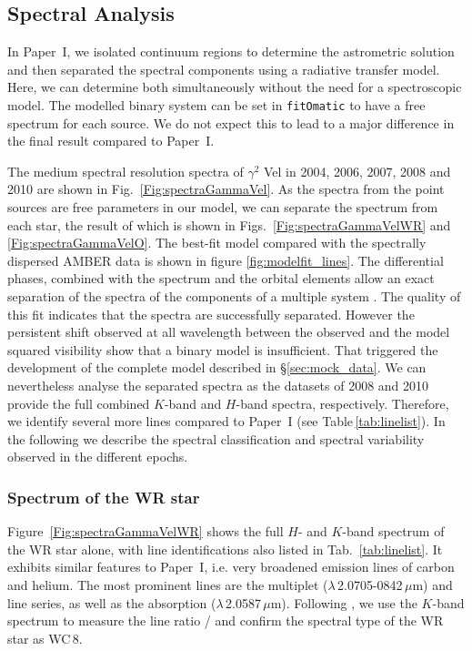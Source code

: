 \documentclass[usenatbib]{mnras}%
\begin{document}
\subsection{Spectral Analysis}\label{sec:data_spectrum}

In Paper~I, we isolated continuum regions to determine the astrometric solution and then separated the spectral components using a radiative transfer model. Here, we can determine both simultaneously without the need for a spectroscopic model. The modelled binary system can be set in \texttt{fitOmatic} to have a free spectrum for each source.  We do not expect this to lead to a major difference in the final result compared to Paper~I.

The medium spectral resolution spectra of $\gamma^2$ Vel in 2004, 2006, 2007, 2008 and 2010 are shown in Fig.~\ref{Fig:spectraGammaVel}. As the spectra from the point sources are free parameters in our model, we can separate the spectrum from each star, the result of which is shown in Figs.~\ref{Fig:spectraGammaVelWR} and \ref{Fig:spectraGammaVelO}.  The best-fit model compared with the spectrally dispersed AMBER data is shown in figure \ref{fig:modelfit_lines}. The differential phases, combined with the spectrum and the orbital elements allow an exact separation of the spectra of the components of a multiple system \citep{1996AstL...22..348P}. The quality of this fit indicates that the spectra are successfully separated. However the persistent shift observed at all wavelength between the observed and the model squared visibility show that a binary model is insufficient. That triggered the development of the complete model described in \S \ref{sec:mock_data}.  We can nevertheless analyse the separated spectra as the datasets of 2008 and 2010 provide the full combined $K$-band and $H$-band spectra, respectively. Therefore, we identify several more lines compared to Paper~I (see Table\,\ref{tab:linelist}). In the following we describe the spectral classification and spectral variability observed in the different epochs.

\subsubsection{Spectrum of the WR star}

Figure~\ref{Fig:spectraGammaVelWR} shows the full $H$- and $K$-band spectrum of the WR star alone, with line identifications also listed in Tab.~\ref{tab:linelist}. It exhibits similar features to Paper~I, i.e. very broadened emission lines of carbon and helium. The most prominent lines are the  multiplet ($\lambda$\,2.0705-0842\,$\mu$m) and  line series, as well as the  absorption ($\lambda$\,2.0587\,$\mu$m). Following \citet{Crowther+2006}, we use the $K$-band spectrum to measure the line ratio / and confirm the spectral type of the WR star as WC\,8.
\end{document}
